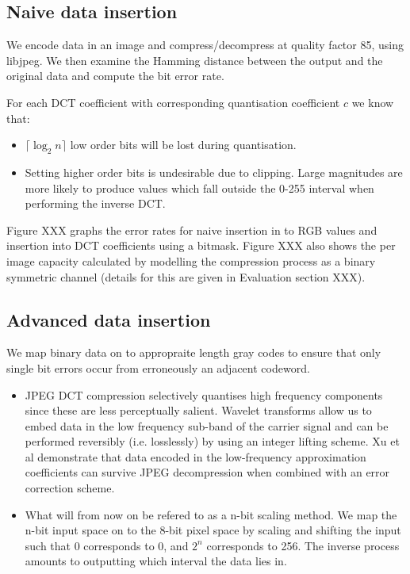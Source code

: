 \FloatBarrier
\subsection{Naive data insertion}

We encode data in an image and compress/decompress at quality factor 85, using libjpeg. We then examine the Hamming distance between the output and the original data and compute the bit error rate.

For each DCT coefficient with corresponding quantisation coefficient $c$ we know that:

\begin{itemize}

    \item $ \lceil \log_2 n \rceil $ low order bits will be lost during quantisation.
    
    \item Setting higher order bits is undesirable due to clipping. Large magnitudes are more likely to produce values which fall outside the 0-255 interval when performing the inverse DCT. 

\end{itemize}

Figure XXX graphs the error rates for naive insertion in to RGB values and insertion into DCT coefficients using a bitmask. Figure XXX also shows the per image capacity calculated by modelling the compression process as a binary symmetric channel (details for this are given in Evaluation section XXX).


\FloatBarrier
\subsection{Advanced data insertion}

We map binary data on to appropraite length gray codes to ensure that only single bit errors occur from erroneously an adjacent codeword.

\begin{itemize}

    \item JPEG DCT compression selectively quantises high frequency components since these are less perceptually salient. Wavelet transforms allow us to embed data in the low frequency sub-band of the carrier signal and can be performed reversibly (i.e. losslessly) by using an integer lifting scheme. Xu et al demonstrate that \cite{haar} data encoded in the low-frequency approximation coefficients can survive JPEG decompression when combined with an error correction scheme.
    
    \item What will from now on be refered to as a n-bit scaling method. We map the n-bit input space on to the 8-bit pixel space by scaling and shifting the input such that 0 corresponds to 0, and $2^n$ corresponds to 256. The inverse process amounts to outputting which interval the data lies in.

\end{itemize}

